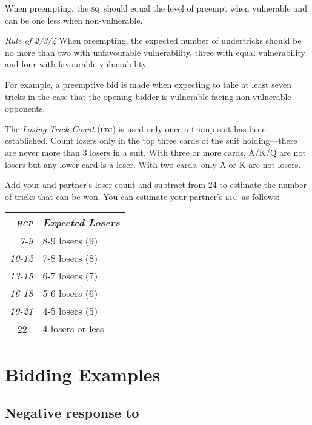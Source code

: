 \documentclass[a4paper,article,oneside]{memoir}
\newcommand{\gap}{\vspace{\baselineskip}}
\newcommand{\hcp}{\textsc{hcp}}
\newcommand{\sq}{\textsc{sq}}
\newcommand{\ltc}{\textsc{ltc}}
\begin{document}
When preempting, the \sq\ should equal the level of preempt when
vulnerable and can be one less when non-vulnerable.

\gap

\emph{Rule of 2/3/4} When preempting, the expected number of undertricks should
be no more than two with unfavourable vulnerability, three with equal vulnerability
and four with favourable vulnerability.

For example, a  preemptive bid is made when expecting to take at least seven
tricks in the case that the opening bidder is vulnerable facing non-vulnerable opponents.

\gap

The \emph{Losing Trick Count} (\ltc) is used only once a trump suit
has been established. Count losers only in the top three cards of the
suit holding---there are never more than 3 losers in a suit. With
three or more cards, A/K/Q are not losers but any lower card is a
loser. With two cards, only A or K are not losers.

Add your and partner's loser count and subtract from 24 to estimate
the number of tricks that can be won.  You can estimate your partner's
\ltc\ as follows:

\begin{tabular}{rp{3cm}}
  \emph{\hcp{}} & \emph{Expected Losers} \\
  \hline
  \emph{7-9} & 8-9 losers (9) \\
  \emph{10-12} & 7-8 losers (8) \\
  \emph{13-15} & 6-7 losers (7) \\
  \emph{16-18} & 5-6 losers (6) \\
  \emph{19-21} & 4-5 losers (5) \\
  \emph{$22^+$} & 4 losers or less \\
  \hline
\end{tabular}

\pagebreak

\section{Bidding Examples}

\subsection{Negative response to }
\end{document}
